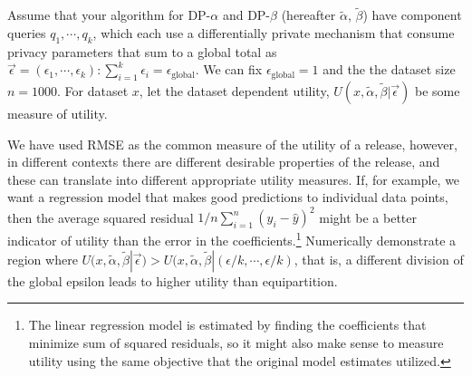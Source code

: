 \documentclass[11pt]{article}
\begin{document}
\begin{enumerate}[leftmargin=*]
\begin{enumerate}
\iffalse   
    \item  Now, run experiments to see if there is
    a different
    partition $p$ of your privacy budget $\epsilon$
    in your algorithm that yields better utility.
    Use a grid search\footnote{Grid search is a term from optimization and machine learning that refers to an exhaustive search through the hyperparameter space discretized into a grid (to make the search finite).} to explore different
    partitions of $\epsilon$ and see if you find one that is convincingly better (in terms
    of mean-squared residuals)
    than an equal partition ($p=1/2$) under the given
    data distribution. Show and explain your results. \CWnote{Perhaps offer more guidance on what the grid search should look like? For example, maybe suggest the interval of values to search over, and the spacing between these values.}
\fi

    \iffalse
    Assume that your algorithm for DP-$\alpha$ and DP-$\beta$ (hereafter $\tilde{\alpha}$, $\tilde{\beta}$) have component queries $q_1,\cdots,q_k$, which each use a differentially private mechanism that consume privacy parameters that sum to a global total as $\Vec{\epsilon}=(\epsilon_1, \cdots, \epsilon_k):\sum_{i=1}^k \epsilon_i = \epsilon_{\textrm{global}}$. We can fix $\epsilon_{\textrm{global}}=1$ and the the dataset size $n=1000$.  For dataset $x$, let the dataset dependent utility, $U(x, \tilde{\alpha}, \tilde{\beta}|\Vec{\epsilon})$ be some measure of utility.  
    
    We have used RMSE as the common measure of the utility of a release, however, in different contexts there are different desirable properties of the release, and these can translate into different appropriate utility measures.  If, for example, we want a regression model that makes good predictions to individual data points, then the average squared residual $1/n\sum_{i=1}^n (y_i-\hat{y})^2$ might be a better indicator of utility than the error in the coefficients.\footnote{The linear regression model is estimated by finding the coefficients that minimize sum of squared residuals, so it might also make sense to measure utility using the same objective that the original model estimates utilized.} Numerically demonstrate a region where $U(x, \tilde{\alpha}, \tilde{\beta}|\Vec{\epsilon}) > U(x, \tilde{\alpha}, \tilde{\beta}| (\epsilon/k, \cdots, \epsilon/k)$, that is, a different division of the global epsilon leads to higher utility than equipartition. 
  

\end{enumerate}
\end{enumerate}
\end{document}
